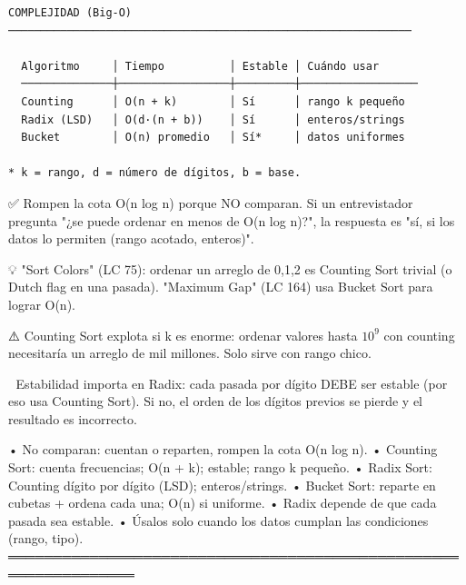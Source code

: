 \begin{lstlisting}
COMPLEJIDAD (Big-O)
──────────────────────────────────────────────────────────────

  Algoritmo     │ Tiempo          │ Estable │ Cuándo usar
  ──────────────┼─────────────────┼─────────┼──────────────────
  Counting      │ O(n + k)        │ Sí      │ rango k pequeño
  Radix (LSD)   │ O(d·(n + b))    │ Sí      │ enteros/strings
  Bucket        │ O(n) promedio   │ Sí*     │ datos uniformes

* k = rango, d = número de dígitos, b = base.
\end{lstlisting}

\begin{dsaentrevistas}

✅ Rompen la cota O(n log n) porque NO comparan. Si un entrevistador
   pregunta "¿se puede ordenar en menos de O(n log n)?", la respuesta es
   "sí, si los datos lo permiten (rango acotado, enteros)".

💡 "Sort Colors" (LC 75): ordenar un arreglo de 0,1,2 es Counting Sort
   trivial (o Dutch flag en una pasada). "Maximum Gap" (LC 164) usa
   Bucket Sort para lograr O(n).

⚠️ Counting Sort explota si k es enorme: ordenar valores hasta $10^9$
   con counting necesitaría un arreglo de mil millones. Solo sirve con
   rango chico.

🔑 Estabilidad importa en Radix: cada pasada por dígito DEBE ser estable
   (por eso usa Counting Sort). Si no, el orden de los dígitos previos se
   pierde y el resultado es incorrecto.

\end{dsaentrevistas}

\begin{dsaresumen}

• No comparan: cuentan o reparten, rompen la cota O(n log n).
• Counting Sort: cuenta frecuencias; O(n + k); estable; rango k pequeño.
• Radix Sort: Counting dígito por dígito (LSD); enteros/strings.
• Bucket Sort: reparte en cubetas + ordena cada una; O(n) si uniforme.
• Radix depende de que cada pasada sea estable.
• Úsalos solo cuando los datos cumplan las condiciones (rango, tipo).
════════════════════════════════════════════════════════════════

\end{dsaresumen}
